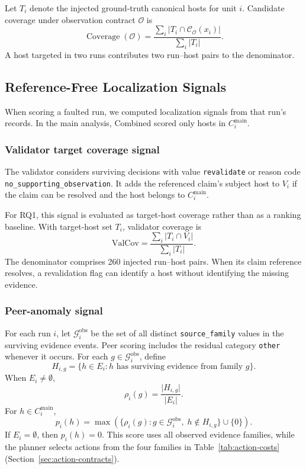 \documentclass[sn-basic]{sn-jnl}%
\theoremstyle{thmstyleone}%
\theoremstyle{thmstyletwo}%
\theoremstyle{thmstylethree}%
\begin{document}
Let \(T_i\) denote the injected ground-truth canonical hosts for unit \(i\). Candidate coverage under observation contract \(\mathcal{O}\) is
\[
\operatorname{Coverage}(\mathcal{O})
=
\frac{\displaystyle\sum_i
      \bigl|T_i \cap \mathcal{C}_{\mathcal{O}}(x_i)\bigr|}
     {\displaystyle\sum_i \lvert T_i \rvert}.
\]
A host targeted in two runs contributes two run--host pairs to the denominator.

\subsection{Reference-Free Localization Signals}\label{sec:localization-signals}

When scoring a faulted run, we computed localization signals from that run's records. In the main analysis, Combined scored only hosts in \(C_i^{\mathrm{main}}\).

\subsubsection{Validator target coverage signal}\label{sec:validator-coverage}

The validator considers surviving decisions with value \texttt{revalidate} or reason code \texttt{no\_supporting\_observation}. It adds the referenced claim's subject host to \(V_i\) if the claim can be resolved and the host belongs to \(C_i^{\mathrm{main}}\).

For RQ1, this signal is evaluated as target-host coverage rather than as a ranking baseline. With target-host set \(T_i\), validator coverage is
\[
\mathrm{ValCov}
=
\frac{\displaystyle\sum_i \lvert T_i \cap V_i \rvert}
     {\displaystyle\sum_i \lvert T_i \rvert}.
\]
The denominator comprises 260 injected run--host pairs. When its claim reference resolves, a revalidation flag can identify a host without identifying the missing evidence.

\subsubsection{Peer-anomaly signal}\label{sec:peer-anomaly}

For each run \(i\), let \(\mathcal{G}_i^{\mathrm{obs}}\) be the set of all distinct \texttt{source\_family} values in the surviving evidence events. Peer scoring includes the residual category \texttt{other} whenever it occurs. For each \(g \in \mathcal{G}_i^{\mathrm{obs}}\), define
\[
H_{i,g}
=
\bigl\{ h \in E_i :
    h \text{ has surviving evidence from family } g
\bigr\}.
\]
When \(E_i \ne \emptyset\),
\[
\rho_i(g) = \frac{\lvert H_{i,g} \rvert}{\lvert E_i \rvert}.
\]
For \(h \in C_i^{\mathrm{main}}\),
\[
p_i(h)
=
\max\!\left(
    \bigl\{ \rho_i(g) :
        g \in \mathcal{G}_i^{\mathrm{obs}},\;
        h \notin H_{i,g}
    \bigr\}
    \cup \{0\}
\right).
\]
If \(E_i = \emptyset\), then \(p_i(h) = 0\). This score uses all observed evidence families, while the planner selects actions from the four families in Table~\ref{tab:action-costs} (Section~\ref{sec:action-contracts}).
\end{document}
